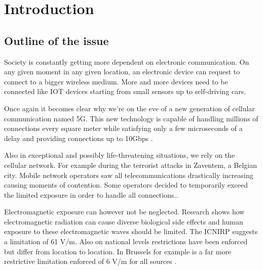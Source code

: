 %

\chapter{Introduction}
\label{chap:intro}

\section{Outline of the issue}
\label{sec:issue}

Society is constantly getting more dependent on electronic communication. On any given moment in any given location, an electronic device
can request to connect to a bigger wireless medium. More and more devices need to be connected like IOT devices starting from small sensors up to self-driving cars.

Once again it becomes clear why we're on the eve of a new generation of cellular communication named 5G. 
This new technology is capable of handling millions of connections every square meter %
while satisfying only a few microseconds of a delay and providing connections up to 10Gbps \cite{bioeffects}.

Also in exceptional and possibly life-threatening situations, we rely on the cellular network. For example during the terrorist attacks in Zaventem, a Belgian city.
Mobile network operators saw all telecommunications drastically increasing causing moments of contention. Some operators decided to temporarily exceed the limited exposure in
order to handle all connections.. \cite{baseZaventem}

Electromagnetic exposure can however not be neglected. Research shows how electromagnetic radiation can cause diverse biological side effects \cite{bioeffects} and human exposure to these electromagnetic waves should be limited. The ICNIRP %
suggests a limitation of 61 V/m. Also on national levels restrictions have been enforced but differ from location to location. In Brussels for example is a far more restrictive limitation enforced of 6 V/m for all sources \cite{J1, J5}.
